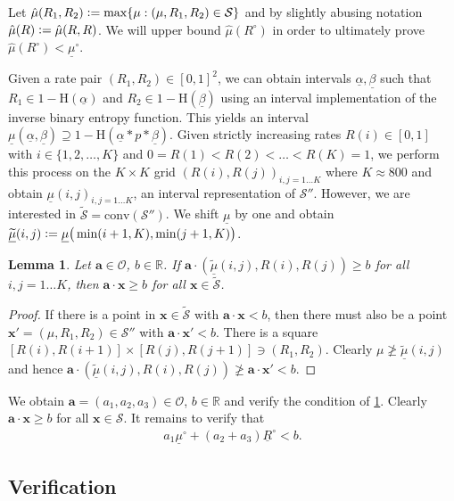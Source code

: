 \documentclass[a4paper,12pt]{scrartcl}
\newtheorem{lemma}{Lemma}
\newcommand{\cvx}[1]{\ensuremath{\mathrm{conv}(#1)}}
\newcommand{\ul}[1]{\ensuremath{\underline{#1}}}
\newcommand{\wt}[1]{\ensuremath{\widetilde{#1}}}
\newcommand{\vt}[1]{\ensuremath{\mathbf{#1}}}
\newcommand{\SSS}{\ensuremath{\mathcal S}}
\newcommand{\OOO}{\ensuremath{\mathcal O}}
\newcommand{\RR}{\ensuremath{\mathbb R}}
\newcommand{\defas}{\vcentcolon=}
\newcommand{\binEnt}[1]{\ensuremath{\mathrm{H}(#1)}}
\newcommand{\Nto}[1]{\ensuremath{\{1,2,\dots,#1\}}}
\begin{document}
Let $\hat\mu(R_1,R_2) \defas \max\{\mu : (\mu, R_1, R_2) \in \SSS \}$ and by slightly abusing notation $\hat\mu(R) \defas \hat\mu(R,R)$. We will upper bound $\hat\mu(R^\circ)$ in order to ultimately prove $\hat\mu(R^\circ) < \ul\mu^\circ$.

Given a rate pair $(R_1, R_2) \in [0,1]^2$, we can obtain intervals $\ul\alpha, \ul\beta$ such that $R_1 \in 1 - \binEnt{\ul\alpha}$ and $R_2 \in 1 - \binEnt{\ul\beta}$ using an interval implementation of the inverse binary entropy function. This yields an interval $\ul\mu(\ul\alpha, \ul\beta) \supseteq 1 - \binEnt{\ul\alpha * p * \ul\beta}$.
Given strictly increasing rates $R(i) \in [0,1]$ with $i \in \Nto{K}$ and $0 = R(1) < R(2) < \dots < R(K) = 1$,
we perform this process on the $K \times K$ grid $(R(i), R(j))_{i,j=1\dots K}$ where $K \approx 800$ and obtain $\ul\mu(i,j)_{i,j=1\dots K}$, an interval representation of $\SSS''$. However, we are interested in $\wt\SSS = \cvx{\SSS''}$.
We shift $\ul\mu$ by one and obtain $\ul{\wt\mu}(i,j) \defas \ul\mu\big(\min(i+1,K),\min(j+1,K)\big)$.

\begin{lemma}
  \label{lem:bound}
  Let $\vt a \in \OOO$, $b \in \RR$. If $\vt a \cdot (\ul{\wt\mu}(i,j), R(i), R(j)) \ge b$ for all $i,j = 1\dots K$, then $\vt a \cdot \vt x \ge b$ for all $\vt x \in \wt\SSS$.   
\end{lemma}
\begin{proof}
  If there is a point in $\vt x \in \wt\SSS$ with $\vt a \cdot \vt x < b$, then there must also be a point $\vt x' = (\mu, R_1, R_2)  \in \SSS''$ with $\vt a \cdot \vt x' < b$. There is a square $[R(i), R(i+1)] \times [R(j), R(j+1)] \ni (R_1, R_2)$. Clearly $\mu \not\ge \ul{\wt\mu}(i,j)$ and hence $\vt a \cdot (\ul{\wt\mu}(i,j), R(i), R(j)) \not\ge \vt a \cdot \vt x' < b$.
\end{proof}

We obtain $\vt a = (a_1, a_2, a_3) \in \OOO$, $b \in \RR$ and verify the condition of \cref{lem:bound}. Clearly $\vt a \cdot \vt x \ge b$ for all $\vt x \in \SSS$. It remains to verify that
\begin{align}
  a_1 \ul\mu^\circ + (a_2 + a_3) \ul R^\circ < b  .
\end{align}

\subsection{Verification}
\label{sec:verification}
\end{document}
